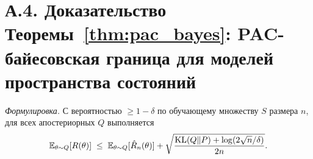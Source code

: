 \section*{А.4. Доказательство Теоремы~\ref{thm:pac_bayes}: PAC-байесовская граница для моделей пространства состояний}
\label{app:proof_pac}

\noindent\textit{Формулировка.} С вероятностью $\ge 1-\delta$ по обучающему множеству $S$ размера $n$, для всех апостериорных $Q$ выполняется
\begin{equation*}
\mathbb{E}_{\theta\sim Q}[R(\theta)]\;\le\;\mathbb{E}_{\theta\sim Q}[\hat{R}_n(\theta)]
+ \sqrt{\frac{\mathrm{KL}(Q\|P)+\log(2\sqrt{n}/\delta)}{2n}}.
\end{equation*}

